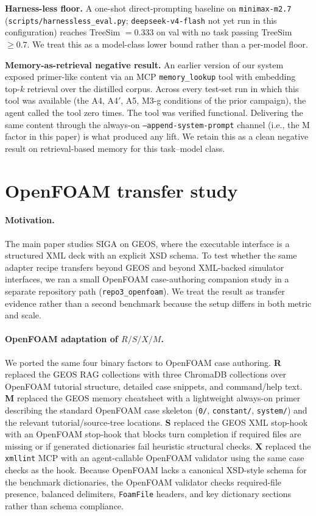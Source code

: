 \documentclass{article}
\begin{document}
\textbf{Harness-less floor.} A one-shot direct-prompting baseline on \texttt{minimax-m2.7} (\texttt{scripts/harnessless\_eval.py}; \texttt{deepseek-v4-flash} not yet run in this configuration) reaches TreeSim $= 0.333$ on val with no task passing TreeSim $\geq 0.7$. We treat this as a model-class lower bound rather than a per-model floor.

\textbf{Memory-as-retrieval negative result.} An earlier version of our system exposed primer-like content via an MCP \texttt{memory\_lookup} tool with embedding top-$k$ retrieval over the distilled corpus. Across every test-set run in which this tool was available (the A4, A4$'$, A5, M3-g conditions of the prior campaign), the agent called the tool zero times. The tool was verified functional. Delivering the same content through the always-on \texttt{--append-system-prompt} channel (i.e., the M factor in this paper) is what produced any lift. We retain this as a clean negative result on retrieval-based memory for this task--model class.

\section{OpenFOAM transfer study}
\label{app:openfoam-transfer}

\paragraph{Motivation.}
The main paper studies SIGA on GEOS, where the executable interface is a structured XML deck with an explicit XSD schema. To test whether the same adapter recipe transfers beyond GEOS and beyond XML-backed simulator interfaces, we ran a small OpenFOAM case-authoring companion study in a separate repository path (\texttt{repo3\_openfoam}). We treat the result as transfer evidence rather than a second benchmark because the setup differs in both metric and scale.

\paragraph{OpenFOAM adaptation of \texorpdfstring{$R/S/X/M$}{R/S/X/M}.}
We ported the same four binary factors to OpenFOAM case authoring. \textbf{R} replaced the GEOS RAG collections with three ChromaDB collections over OpenFOAM tutorial structure, detailed case snippets, and command/help text. \textbf{M} replaced the GEOS memory cheatsheet with a lightweight always-on primer describing the standard OpenFOAM case skeleton (\texttt{0/}, \texttt{constant/}, \texttt{system/}) and the relevant tutorial/source-tree locations. \textbf{S} replaced the GEOS XML stop-hook with an OpenFOAM stop-hook that blocks turn completion if required files are missing or if generated dictionaries fail heuristic structural checks. \textbf{X} replaced the \texttt{xmllint} MCP with an agent-callable OpenFOAM validator using the same case checks as the hook. Because OpenFOAM lacks a canonical XSD-style schema for the benchmark dictionaries, the OpenFOAM validator checks required-file presence, balanced delimiters, \texttt{FoamFile} headers, and key dictionary sections rather than schema compliance.
\end{document}
